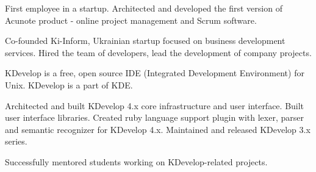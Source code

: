 \documentclass[10pt]{letter}
\begin{document}
\begin{llist}
  \endexperience


  \startexperience

           \item First employee in a startup. Architected and developed the first version
           of Acunote product - online project management and Scrum software.

  \endexperience


  \startexperience

           \item Co-founded Ki-Inform, Ukrainian startup focused on business development
           services. Hired the team of developers, lead the development of company projects.

  \endexperience




  \location{}

  \startexperience

           \item KDevelop is a free, open source IDE (Integrated Development Environment) for Unix.
           KDevelop is a part of KDE.

           \item Architected and built KDevelop 4.x core infrastructure and user interface.
           Built user interface libraries. Created ruby language support plugin with lexer,
           parser and semantic recognizer for KDevelop 4.x. Maintained and released
           KDevelop 3.x series.

  \endexperience

  \location{}

  \startexperience

           \item Successfully mentored students working on KDevelop-related projects.

  \endexperience


\end{llist}
\end{document}
